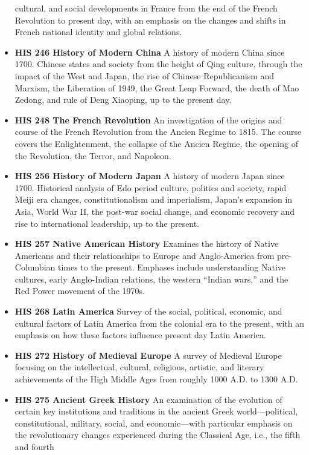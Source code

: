 \documentclass[
  letterpaper,
]{scrbook}
\begin{document}
\begin{itemize}
  cultural, and social developments in France from the end of the French
  Revolution to present day, with an emphasis on the changes and shifts
  in French national identity and global relations.
\item
  \textbf{HIS 246 History of Modern China} A history of modern China
  since 1700. Chinese states and society from the height of Qing
  culture, through the impact of the West and Japan, the rise of Chinese
  Republicanism and Marxism, the Liberation of 1949, the Great Leap
  Forward, the death of Mao Zedong, and rule of Deng Xiaoping, up to the
  present day.
\item
  \textbf{HIS 248 The French Revolution} An investigation of the origins
  and course of the French Revolution from the Ancien Regime to 1815.
  The course covers the Enlightenment, the collapse of the Ancien
  Regime, the opening of the Revolution, the Terror, and Napoleon.
\item
  \textbf{HIS 256 History of Modern Japan} A history of modern Japan
  since 1700. Historical analysis of Edo period culture, politics and
  society, rapid Meiji era changes, constitutionalism and imperialism,
  Japan's expansion in Asia, World War II, the post-war social change,
  and economic recovery and rise to international leadership, up to the
  present.
\item
  \textbf{HIS 257 Native American History} Examines the history of
  Native Americans and their relationships to Europe and Anglo-America
  from pre- Columbian times to the present. Emphases include
  understanding Native cultures, early Anglo-Indian relations, the
  western ``Indian wars,'' and the Red Power movement of the 1970s.
\item
  \textbf{HIS 268 Latin America} Survey of the social, political,
  economic, and cultural factors of Latin America from the colonial era
  to the present, with an emphasis on how these factors influence
  present day Latin America.
\item
  \textbf{HIS 272 History of Medieval Europe} A survey of Medieval
  Europe focusing on the intellectual, cultural, religious, artistic,
  and literary achievements of the High Middle Ages from roughly 1000
  A.D. to 1300 A.D.
\item
  \textbf{HIS 275 Ancient Greek History} An examination of the evolution
  of certain key institutions and traditions in the ancient Greek
  world---political, constitutional, military, social, and
  economic---with particular emphasis on the revolutionary changes
  experienced during the Classical Age, i.e., the fifth and fourth

\end{itemize}
\end{document}
